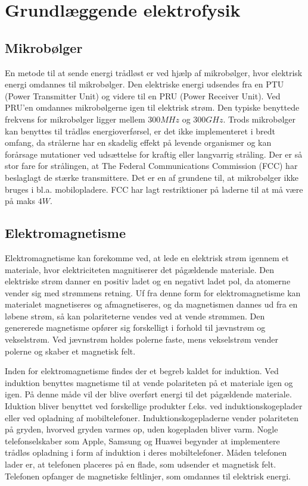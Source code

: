 \section{Grundlæggende elektrofysik}

\subsection{Mikrobølger}

En metode til at sende energi trådløst er ved hjælp af mikrobølger, hvor elektrisk energi omdannes til mikrobølger. Den elektriske energi udsendes fra en PTU (Power Transmitter Unit) og videre til en PRU (Power Receiver Unit). Ved PRU'en omdannes mikrobølgerne igen til elektrisk strøm. Den typiske benyttede frekvens for mikrobølger ligger mellem $300 MHz$ og $300 GHz$. Trods mikrobølger kan benyttes til trådløs energioverførsel, er det ikke implementeret i bredt omfang, da strålerne har en skadelig effekt på levende organismer og kan forårsage mutationer ved udsættelse for kraftig eller langvarrig stråling. Der er så stor fare for strålingen, at The Federal Communications Commission (FCC) har beslaglagt de stærke transmittere. Det er en af grundene til, at mikrobølger ikke bruges i bl.a. mobilopladere. FCC har lagt restriktioner på laderne til at må være på maks $4 W$. \cite{mikro}

\subsection{Elektromagnetisme}
Elektromagnetisme kan forekomme ved, at lede en elektrisk strøm igennem et materiale, hvor elektriciteten magnitiserer det pågældende materiale. Den elektriske strøm danner en positiv ladet og en negativt ladet pol, da atomerne vender sig med strømmens retning. Uf fra denne form for elektromagnetisme kan materialet magnetiseres og afmagnetiseres, og da magnetismen dannes ud fra en løbene strøm, så kan polariteterne vendes ved at vende strømmen. Den genererede magnetisme opfører sig forskelligt i forhold til jævnstrøm og vekselstrøm. Ved jævnstrøm holdes polerne faste, mens vekselstrøm vender polerne og skaber et magnetisk felt.

Inden for elektromagnetisme findes der et begreb kaldet for induktion. Ved induktion benyttes magnetisme til at vende polariteten på et materiale igen og igen. På denne måde vil der blive overført energi til det pågældende materiale. Iduktion bliver benyttet ved forskellige produkter f.eks. ved induktionskogeplader eller ved opladning af mobiltelefoner. Induktionskogepladerne vender polariteten på gryden, hvorved gryden varmes op, uden kogepladen bliver varm. Nogle telefonselskaber som Apple, Samsung og Huawei begynder at implementere trådløs opladning i form af induktion i deres mobiltelefoner. Måden telefonen lader er, at telefonen placeres på en flade, som udsender et magnetisk felt. Telefonen opfanger de magnetiske feltlinjer, som omdannes til elektrisk energi. \cite{mikro}

